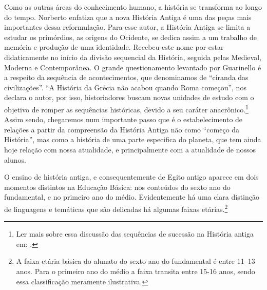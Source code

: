 \begin{refsection}
    Como as outras áreas do conhecimento humano, a história se transforma ao longo do tempo. Norberto \textcite{Guarinello2013Historia} enfatiza que a nova História Antiga é uma das peças mais importantes dessa reformulação. Para esse autor, a História Antiga se limita a estudar os primórdios, as origens do Ocidente, se dedica assim a um trabalho de memória e produção de uma identidade. Recebeu este nome por estar didaticamente no início da divisão sequencial da História, seguida pelas Medieval, Moderna e Contemporânea. O grande questionamento levantado por Guarinello é a respeito da sequência de acontecimentos, que denominamos de ``ciranda das civilizações''. ``A História da Grécia não acabou quando Roma começou'', nos declara o autor, por isso, historiadores buscam novas unidades de estudo com o objetivo de romper as sequências históricas, devido a seu caráter anacrônico.\footnote{Ler mais sobre essa discussão das sequências de sucessão na História antiga em: .} Assim sendo, chegaremos num importante passo que é o estabelecimento de relações a partir da compreensão da História Antiga não como ``começo da História'', mas como a história de uma parte especifica do planeta, que tem ainda hoje relação com nossa atualidade, e principalmente com a atualidade de nossos alunos. 

    O ensino de história antiga, e consequentemente de Egito antigo aparece em dois momentos distintos na Educação Básica: nos conteúdos do sexto ano do fundamental, e no primeiro ano do médio. Evidentemente há uma clara distinção de linguagens e temáticas que são delicadas há algumas faixas etárias.\footnote{A faixa etária básica do alunato do sexto ano do fundamental é entre 11--13 anos. Para o primeiro ano do médio a faixa transita entre 15-16 anos, sendo essa classificação meramente ilustrativa.}


\end{refsection}
